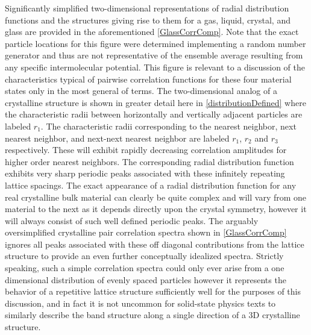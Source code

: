 Significantly simplified two-dimensional representations of radial distribution functions and the structures giving rise to them for a gas, liquid, crystal, and glass are provided in the aforementioned \fig \nolinebreak \ref{GlassCorrComp}.  Note that the exact particle locations for this figure were determined implementing a random number generator and thus are not representative of the ensemble average resulting from any specific intermolecular potential.  This figure is relevant to a discussion of the characteristics typical of pairwise correlation functions for these four material states only in the most general of terms.  The two-dimensional analog of a crystalline structure is shown in greater detail here in \fig \nolinebreak \ref{distributionDefined} where the characteristic radii between horizontally and vertically adjacent particles are labeled $r_1$.  The characteristic radii corresponding to the nearest neighbor, next nearest neighbor, and next-next nearest neighbor are labeled $r_1$, $r_2$ and $r_3$ respectively.  These will exhibit rapidly decreasing correlation amplitudes for higher order nearest neighbors.  The corresponding radial distribution function exhibits very sharp periodic peaks associated with these infinitely repeating lattice spacings.  The exact appearance of a radial distribution function for any real crystalline bulk material can clearly be quite complex and will vary from one material to the next as it depends directly upon the crystal symmetry, however it will always consist of such well defined periodic peaks.  The arguably oversimplified crystalline pair correlation spectra shown in \fig \nolinebreak \ref{GlassCorrComp} ignores all peaks associated with these off diagonal contributions from the lattice structure to provide an even further conceptually idealized spectra.  Strictly speaking, such a simple correlation spectra could only ever arise from a one dimensional distribution of evenly spaced particles however it represents the behavior of a repetitive lattice structure sufficiently well for the purposes of this discussion, and in fact it is not uncommon for solid-state physics texts to similarly describe the band structure along a single direction of a 3D crystalline structure.

